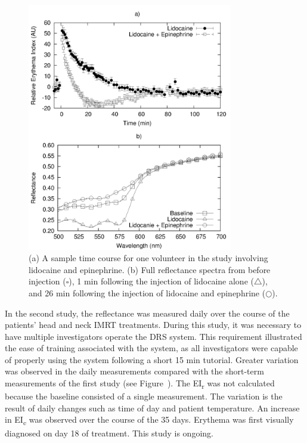 \begin{figure}
	\centering \includegraphics[width=0.8\textwidth]{figures/p1-lido_epi.png}
	\caption[Sample time course for lidocaine \& epinephrine]{\label{fig:p1-lido_epi}(a) A sample time course for one volunteer in the study involving lidocaine and epinephrine. (b) Full reflectance spectra from before injection ($\square$), 1 min following the injection of lidocaine alone ($\triangle$), and 26 min following the injection of lidocaine and epinephrine ($\bigcirc$).}
\end{figure}

In the second study, the reflectance was measured daily over the course of the patients’ head and neck IMRT treatments. During this study, it was necessary to have multiple investigators operate the DRS system. This requirement illustrated the ease of training associated with the system, as all investigators were capable of properly using the system following a short 15 min tutorial. Greater variation was observed in the daily measurements compared with the short-term measurements of the first study (see Figure~). The EI\textsubscript{r} was not calculated because the baseline consisted of a single measurement. The variation is the result of daily changes such as time of day and patient temperature.\cite{Fullerton1996} An increase in EI\textsubscript{c} was observed over the course of the 35 days. Erythema was first visually diagnosed on day 18 of treatment. This study is ongoing.

